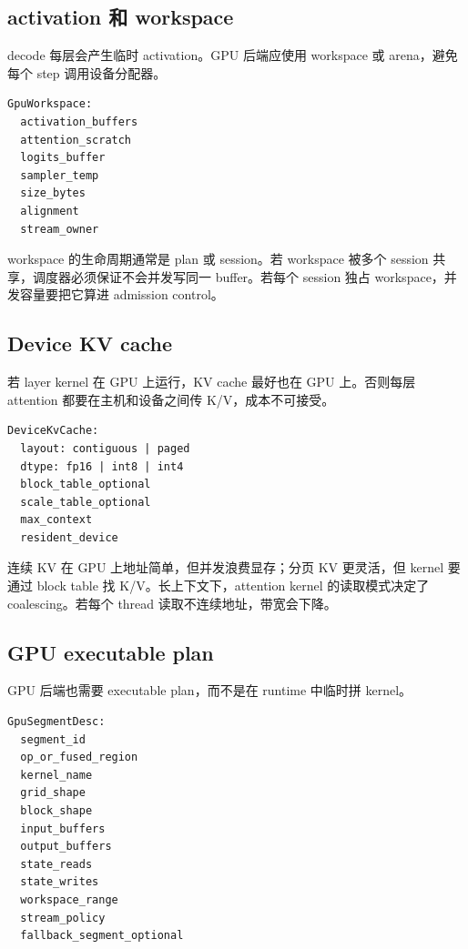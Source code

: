 \subsection{activation 和 workspace}

decode 每层会产生临时 activation。GPU 后端应使用 workspace 或 arena，避免每个 step 调用设备分配器。

\begin{lstlisting}[numbers=none,caption={GPU workspace 字段}]
GpuWorkspace:
  activation_buffers
  attention_scratch
  logits_buffer
  sampler_temp
  size_bytes
  alignment
  stream_owner
\end{lstlisting}

workspace 的生命周期通常是 plan 或 session。若 workspace 被多个 session 共享，调度器必须保证不会并发写同一 buffer。若每个 session 独占 workspace，并发容量要把它算进 admission control。

\subsection{Device KV cache}

若 layer kernel 在 GPU 上运行，KV cache 最好也在 GPU 上。否则每层 attention 都要在主机和设备之间传 K/V，成本不可接受。

\begin{lstlisting}[numbers=none,caption={GPU KV cache 设计点}]
DeviceKvCache:
  layout: contiguous | paged
  dtype: fp16 | int8 | int4
  block_table_optional
  scale_table_optional
  max_context
  resident_device
\end{lstlisting}

连续 KV 在 GPU 上地址简单，但并发浪费显存；分页 KV 更灵活，但 kernel 要通过 block table 找 K/V。长上下文下，attention kernel 的读取模式决定了 coalescing。若每个 thread 读取不连续地址，带宽会下降。

\subsection{GPU executable plan}

GPU 后端也需要 executable plan，而不是在 runtime 中临时拼 kernel。

\begin{lstlisting}[numbers=none,caption={GPU segment descriptor}]
GpuSegmentDesc:
  segment_id
  op_or_fused_region
  kernel_name
  grid_shape
  block_shape
  input_buffers
  output_buffers
  state_reads
  state_writes
  workspace_range
  stream_policy
  fallback_segment_optional
\end{lstlisting}


